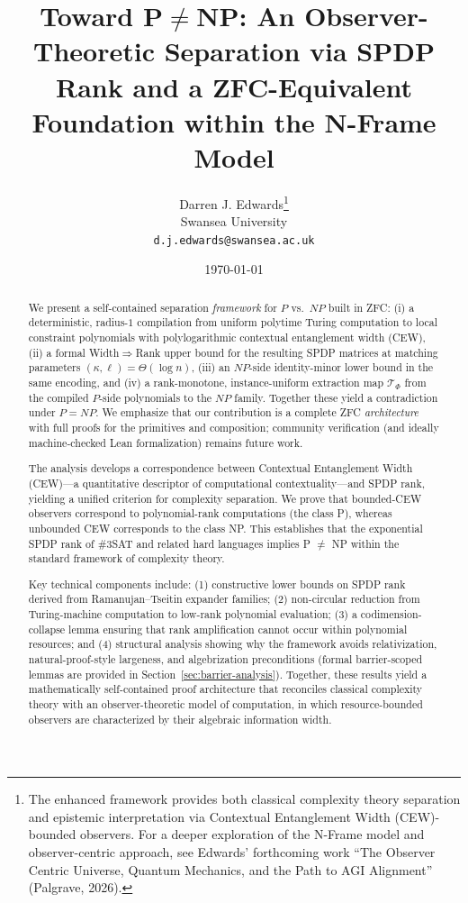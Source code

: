 \documentclass[12pt]{article}
\title{Toward $\mathbf{P} \ne \mathbf{NP}$: An Observer-Theoretic Separation via SPDP Rank and a ZFC-Equivalent Foundation within the N-Frame Model}
\author{Darren J. Edwards\thanks{The enhanced framework provides both classical complexity theory separation and epistemic interpretation via Contextual Entanglement Width (CEW)-bounded observers. For a deeper exploration of the N-Frame model and observer-centric approach, see Edwards' forthcoming work ``The Observer Centric Universe, Quantum Mechanics, and the Path to AGI Alignment'' (Palgrave, 2026).} \\
  Swansea University \\
  \texttt{d.j.edwards@swansea.ac.uk}}
\date{\today}
\theoremstyle{definition}
\theoremstyle{definition}
\theoremstyle{remark}
\theoremstyle{remark}
\begin{document}
\maketitle


\begin{abstract}
We present a self-contained separation \emph{framework} for $P$ vs.\ $NP$ built in ZFC: (i) a deterministic, radius-$1$ compilation from uniform polytime Turing computation to local constraint polynomials with polylogarithmic contextual entanglement width (CEW), (ii) a formal Width$\Rightarrow$Rank upper bound for the resulting SPDP matrices at matching parameters $(\kappa,\ell)=\Theta(\log n)$, (iii) an $NP$-side identity-minor lower bound in the same encoding, and (iv) a rank-monotone, instance-uniform extraction map $\mathcal{T}_\Phi$ from the compiled $P$-side polynomials to the $NP$ family. Together these yield a contradiction under $P{= }NP$. We emphasize that our contribution is a complete ZFC \emph{architecture} with full proofs for the primitives and composition; community verification (and ideally machine-checked Lean formalization) remains future work.

The analysis develops a correspondence between Contextual Entanglement Width (CEW)---a quantitative descriptor of computational contextuality---and SPDP rank, yielding a unified criterion for complexity separation. We prove that bounded-CEW observers correspond to polynomial-rank computations (the class P), whereas unbounded CEW corresponds to the class NP. This establishes that the exponential SPDP rank of \#3SAT and related hard languages implies P $\neq$ NP within the standard framework of complexity theory.

Key technical components include: (1) constructive lower bounds on SPDP rank derived from Ramanujan--Tseitin expander families; (2) non-circular reduction from Turing-machine computation to low-rank polynomial evaluation; (3) a codimension-collapse lemma ensuring that rank amplification cannot occur within polynomial resources; and (4) structural analysis showing why the framework avoids relativization, natural-proof-style largeness, and algebrization preconditions (formal barrier-scoped lemmas are provided in Section~\ref{sec:barrier-analysis}). Together, these results yield a mathematically self-contained proof architecture that reconciles classical complexity theory with an observer-theoretic model of computation, in which resource-bounded observers are characterized by their algebraic information width.
\end{abstract}
\end{document}
